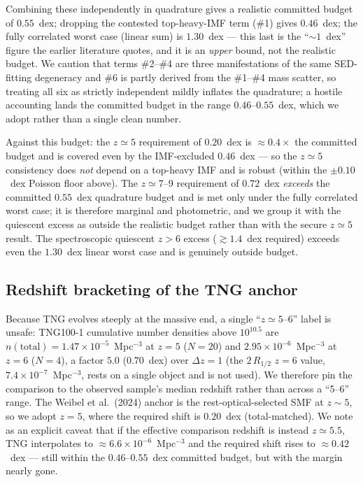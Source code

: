 \documentclass[twocolumn]{aastex631}
\begin{document}
Combining these independently in quadrature gives a realistic committed budget of $0.55$~dex;
dropping the contested top-heavy-IMF term (\#1) gives $0.46$~dex; the fully correlated worst case
(linear sum) is $1.30$~dex --- this last is the ``$\sim1$~dex'' figure the earlier literature quotes,
and it is an \emph{upper} bound, not the realistic budget. We caution that terms \#2--\#4 are three
manifestations of the same SED-fitting degeneracy and \#6 is partly derived from the \#1--\#4 mass
scatter, so treating all six as strictly independent mildly inflates the quadrature; a hostile
accounting lands the committed budget in the range $0.46$--$0.55$~dex, which we adopt rather than a
single clean number.

Against this budget: the $z\simeq5$ requirement of $0.20$~dex is $\approx0.4\times$ the committed
budget and is covered even by the IMF-excluded $0.46$~dex --- so the $z\simeq5$ consistency does
\emph{not} depend on a top-heavy IMF and is robust (within the $\pm0.10$~dex Poisson floor above).
The $z\simeq7$--9 requirement of $0.72$~dex \emph{exceeds} the committed $0.55$~dex quadrature budget
and is met only under the fully correlated worst case; it is therefore marginal and photometric, and
we group it with the quiescent excess as outside the realistic budget rather than with the secure
$z\simeq5$ result. The spectroscopic quiescent $z>6$ excess ($\gtrsim1.4$~dex required) exceeds even
the $1.30$~dex linear worst case and is genuinely outside budget.

\subsection{Redshift bracketing of the TNG anchor}
Because TNG evolves steeply at the massive end, a single ``$z\simeq5$--6'' label is unsafe: TNG100-1
cumulative number densities above $10^{10.5}$ are $n(\mathrm{total})=1.47\times10^{-5}$~Mpc$^{-3}$ at
$z=5$ ($N=20$) and $2.95\times10^{-6}$~Mpc$^{-3}$ at $z=6$ ($N=4$), a factor $5.0$ ($0.70$~dex) over
$\Delta z=1$ (the $2\,R_{1/2}$ $z=6$ value, $7.4\times10^{-7}$~Mpc$^{-3}$, rests on a single object and
is not used). We therefore pin the comparison to the observed sample's median redshift rather than
across a ``5--6'' range. The Weibel et al.\ (2024) anchor is the rest-optical-selected SMF at
$z\sim5$, so we adopt $z=5$, where the required shift is $0.20$~dex (total-matched). We note as an
explicit caveat that if the effective comparison redshift is instead $z\simeq5.5$, TNG interpolates to
$\approx6.6\times10^{-6}$~Mpc$^{-3}$ and the required shift rises to $\approx0.42$~dex --- still within
the $0.46$--$0.55$~dex committed budget, but with the margin nearly gone.
\end{document}
